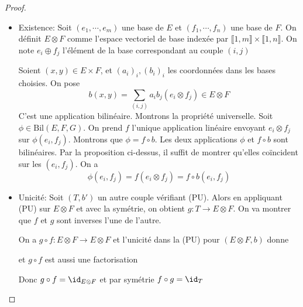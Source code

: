 \begin{proof}~
\begin{itemize}
    \item Existence: Soit $(e_1, \cdots , e_m)$ une base de $E$ et  $(f_1, \cdots , f_n)$ une base de $F$. On définit  $E\otimes F$ comme l'espace vectoriel de base indexée par  $\llbracket 1,m \rrbracket \times \llbracket 1,n \rrbracket $. On note $e_i\oplus f_j$ l'élément de la base correspondant au couple  $(i, j)$ 
    
        Soient $(x, y) \in  E\times F$, et $(a_i)_i, (b_i)_i$ les coordonnées dans les bases choisies. On pose \[
            b(x, y)= \sum_{(i, j)} a_ib_j(e_i\otimes f_j) \in  E\otimes F
        \] 
        C'est une application bilinéaire. Montrons la propriété universelle. Soit $\phi \in  \mathrm{Bil}(E, F, G)$. On prend $f$ l'unique application linéaire envoyant  $e_i\otimes f_j$ sur  $\phi(e_i, f_j)$. Montrons que  $\phi=f\circ b$. Les deux applications  $\phi$ et  $f\circ b$ sont bilinéaires. Par la proposition ci-dessus, il suffit de montrer qu'elles coïncident sur  les $(e_i, f_j)$. On a  \[
            \phi(e_i, f_j)=f(e_i\otimes f_j)=f\circ b(e_i, f_j)
        \] 
    \item Unicité: Soit $(T, b')$ un autre couple vérifiant  (PU). Alors en appliquant (PU) sur $E\otimes F$ et avec la symétrie, on obtient  $g:T\longrightarrow E\otimes F$. On va montrer que $f$ et  $g$ sont inverses l'une de l'autre.
 \begin{center}
\end{center}
On a $g\circ f: E\otimes F \longrightarrow E\otimes F$ et l'unicité dans la (PU) pour $(E\otimes F, b)$ donne 
 \begin{center}
\end{center}
et $g\circ f$ est aussi une factorisation
 \begin{center}
\end{center}
Donc $g\circ f=\id_{E\otimes F}$ et par symétrie $f\circ g=\id_T$
\end{itemize}
\end{proof}

